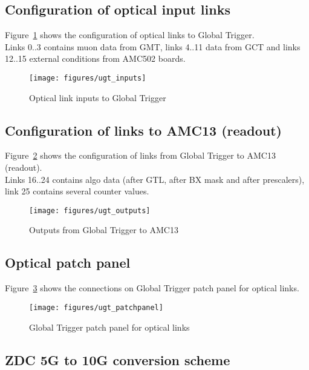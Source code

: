 \clearpage

\subsection{Configuration of optical input links}\label{sec:app:app_b}

Figure~\ref{fig:app:ugt_inputs} shows the configuration of optical links to Global Trigger.\\
Links 0..3 contains muon data from GMT, links 4..11 data from GCT and links 12..15 external conditions
from AMC502 boards.

\begin{figure}[htb]
\centering
\texttt{[image: figures/ugt\_inputs]}
\caption{Optical link inputs to Global Trigger}
\label{fig:app:ugt_inputs}
\end{figure}

\subsection{Configuration of links to AMC13 (readout)}\label{sec:app:app_c}

Figure~\ref{fig:app:ugt_outputs} shows the configuration of links from Global Trigger to AMC13 (readout).\\
Links 16..24 contains algo data (after GTL, after BX mask and after prescalers), link 25 contains several counter values.

\begin{figure}[htb]
\centering
\texttt{[image: figures/ugt\_outputs]}
\caption{Outputs from Global Trigger to AMC13}
\label{fig:app:ugt_outputs}
\end{figure}

\clearpage

\subsection{Optical patch panel}\label{sec:app:app_d}

Figure~\ref{fig:app:ugt_pp} shows the connections on Global Trigger patch panel for optical links.

\begin{figure}[htb]
\centering
\texttt{[image: figures/ugt\_patchpanel]}
\caption{Global Trigger patch panel for optical links}
\label{fig:app:ugt_pp}
\end{figure}

\clearpage
\subsection{ZDC 5G to 10G conversion scheme}\label{sec:app:zdc_5g_10g_conv}

